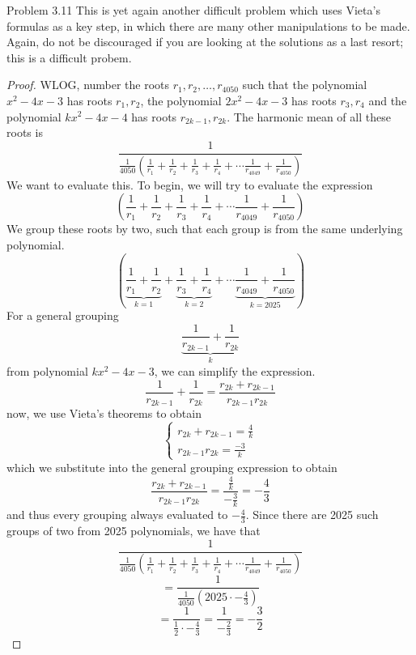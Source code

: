 \begin{sol}{Problem 3.11}
This is yet again another difficult problem which uses Vieta's formulas as a key step, in which there are many other manipulations to be made. Again, do not be discouraged if you are looking at the solutions as a last resort; this is a difficult probem.
\begin{proof}
WLOG, number the roots $r_1, r_2, \ldots, r_{4050}$ such that the polynomial $x^2 - 4x - 3$ has roots $r_1, r_2$, the polynomial $2x^2 - 4x - 3$ has roots $r_3, r_4$ and the polynomial $kx^2 - 4x - 4$ has roots $r_{2k-1}, r_{2k}$. The harmonic mean of all these roots is 
\[
\frac{1}{\frac{1}{4050}\left( \frac{1}{r_1} + \frac{1}{r_2} + \frac{1}{r_3} + \frac{1}{r_4} + \cdots \frac{1}{r_{4049}} + \frac{1}{r_{4050}} \right)}
\]
We want to evaluate this. To begin, we will try to evaluate the expression
\[
\left( \frac{1}{r_1} + \frac{1}{r_2} + \frac{1}{r_3} + \frac{1}{r_4} + \cdots \frac{1}{r_{4049}} + \frac{1}{r_{4050}} \right)
\]
We group these roots by two, such that each group is from the same underlying polynomial. 
\[
\left( \underbrace{\frac{1}{r_1} + \frac{1}{r_2}}_{k = 1} + \underbrace{\frac{1}{r_3} + \frac{1}{r_4}}_{k = 2} + \cdots \underbrace{\frac{1}{r_{4049}} + \frac{1}{r_{4050}}}_{k = 2025} \right)
\]
For a general grouping
\[
\underbrace{\frac{1}{r_{2k-1}} + \frac{1}{r_{2k}}}_{k}
\]
from polynomial $kx^2 - 4x - 3$, we can simplify the expression. 
\[
\frac{1}{r_{2k-1}} + \frac{1}{r_{2k}} = \frac{r_{2k} + r_{2k-1}}{r_{2k-1}r_{2k}}
\]
now, we use Vieta's theorems to obtain
\[
\begin{cases}
r_{2k} + r_{2k-1} = \frac{4}{k} \\
r_{2k-1}r_{2k} = \frac{-3}{k}
\end{cases}
\]
which we substitute into the general grouping expression to obtain 
\[
\frac{r_{2k} + r_{2k-1}}{r_{2k-1}r_{2k}} = \frac{\frac{4}{k}}{-\frac{3}{k}} = -\frac{4}{3}
\]
and thus every grouping always evaluated to $-\frac{4}{3}$. Since there are 2025 such groups of two from 2025 polynomials, we have that 
\[
\frac{1}{\frac{1}{4050}\left( \frac{1}{r_1} + \frac{1}{r_2} + \frac{1}{r_3} + \frac{1}{r_4} + \cdots \frac{1}{r_{4049}} + \frac{1}{r_{4050}} \right)} 
\]
\[
= \frac{1}{\frac{1}{4050}\left(2025 \cdot -\frac{4}{3} \right)}
\]
\[
= \frac{1}{\frac{1}{2}\cdot -\frac{4}{3}} = \frac{1}{-\frac{2}{3}} = \boxed{-\frac{3}{2}}
\]
\end{proof}
\end{sol}

